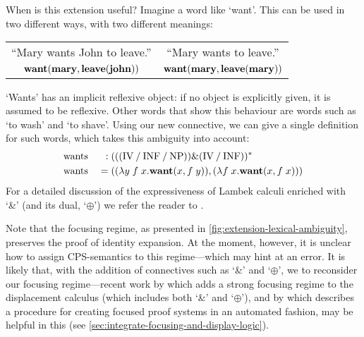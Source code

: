 When is this extension useful? Imagine a word like `want'. This can be
used in two different ways, with two different meanings:\\
\begin{center}
  \vspace{-1\baselineskip}
  \renewcommand{\arraystretch}{1}
  \begin{tabular}{c c}
    ``Mary wants John to leave.'' & ``Mary wants to leave.''\\
    $\WANT(\MARY,\LEAVE(\JOHN))$  & $\WANT(\MARY,\LEAVE(\MARY))$
  \end{tabular}
\end{center}
`Wants' has an implicit reflexive object: if no object is explicitly
given, it is assumed to be reflexive. Other words that show this
behaviour are words such as `to wash' and `to shave'.
Using our new connective, we can give a single definition for such
words, which takes this ambiguity into account:
\begin{alignat*}{3}
  &\text{wants}\;&:\;&\tr[(((\IV\impl\INF\impl\NP))\&(\IV\impl\INF))]\\
  &\text{wants}\;&=\;&((\lambda y\;f\;x.\WANT(x,f\;y)),(\lambda f\;x.\WANT(x,f\;x)))
\end{alignat*}
For a detailed discussion of the expressiveness of Lambek calculi
enriched with `\&' (and its dual, `$\oplus$') we refer the reader to
\citet{kanazawa1992}.

Note that the focusing regime, as presented in
\autoref{fig:extension-lexical-ambiguity}, preserves the proof of
identity expansion. At the moment, however, it is unclear how to
assign CPS-semantics to this regime---which may hint at an error.
It is likely that, with the addition of connectives such as `\&' and
`$\oplus$', we to reconsider our focusing regime---recent work by
\citet{morrill2015} which adds a strong focusing regime to the
displacement calculus (which includes both `\&' and `$\oplus$'), and
by \citet{nigam2015} which describes a procedure for creating focused
proof systems in an automated fashion, may be helpful in this (see
\autoref{sec:integrate-focusing-and-display-logic}).

